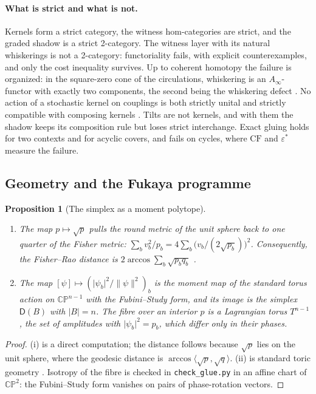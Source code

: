 \documentclass[11pt]{article}
\newtheorem{proposition}[theorem]{Proposition}
\theoremstyle{definition}
\theoremstyle{remark}
\newcommand{\D}{\mathsf{D}}
\begin{document}
\paragraph{What is strict and what is not.} Kernels form a strict category, the witness
hom-categories are strict, and the graded shadow is a strict 2-category. The witness layer with its
natural whiskerings is not a 2-category: functoriality fails, with explicit counterexamples, and only
the cost inequality survives. Up to coherent homotopy the failure is organized: in the square-zero cone of the
circulations, whiskering is an $A_\infty$-functor with exactly two components, the second being the whiskering defect
\cite[Thm.~5.2]{Awasthi-Conditionals}. No action of a stochastic kernel on couplings is both strictly unital and strictly
compatible with composing kernels \cite[Thm.~10.2]{Awasthi-Conditionals}. Tilts are not kernels, and with them the shadow keeps its composition
rule but loses strict interchange. Exact gluing holds for two contexts and for acyclic covers, and
fails on cycles, where $\mathrm{CF}$ and $\varepsilon^*$ measure the failure.

\subsection{Geometry and the Fukaya programme}\label{sec:fukaya}

\begin{proposition}[The simplex as a moment polytope]\label{prop:geometry}
\leavevmode
\begin{enumerate}[label=(\roman*)]
\item The map $p\mapsto\sqrt p$ pulls the round metric of the unit sphere back to one quarter of the
  Fisher metric: $\sum_bv_b^2/p_b=4\sum_b\big(v_b/(2\sqrt{p_b})\big)^2$. Consequently, the Fisher--Rao
  distance is $2\arccos\sum_b\sqrt{p_bq_b}$ \cite{Wootters1981,AmariNagaoka2000}.
\item The map $[\psi]\mapsto(\lvert\psi_b\rvert^2/\lVert\psi\rVert^2)_b$ is the moment map of the
  standard torus action on $\mathbb{CP}^{n-1}$ with the Fubini--Study form, and its image is the
  simplex $\D(B)$ with $\lvert B\rvert=n$. The fibre over an interior $p$ is a Lagrangian torus
  $T^{n-1}$, the set of amplitudes with $\lvert\psi_b\rvert^2=p_b$, which differ only in their phases.
\end{enumerate}
\end{proposition}
\begin{proof}
(i) is a direct computation; the distance follows because $\sqrt p$ lies on the unit sphere, where
the geodesic distance is $\arccos\langle\sqrt p,\sqrt q\rangle$. (ii) is standard toric geometry
\cite{Delzant1988}. Isotropy of the fibre is checked in \texttt{check\_glue.py} in an affine chart of
$\mathbb{CP}^2$: the Fubini--Study form vanishes on pairs of phase-rotation vectors.
\end{proof}
\end{document}
